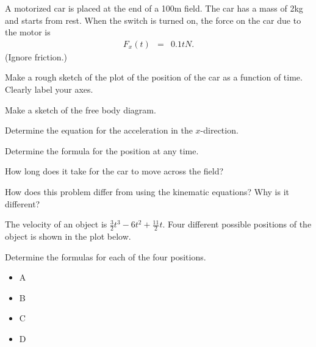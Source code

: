 \begin{problem}

\item A motorized car is placed at the end of a 100m field. The car
  has a mass of 2kg and starts from rest. When the switch is turned
  on, the force on the car due to the motor is
  \begin{eqnarray*}
    F_x(t) & = & 0.1 t N.
  \end{eqnarray*}
  (Ignore friction.)
  \begin{subproblem}
    \item Make a rough sketch of the plot of the position of the car
      as a function of time. Clearly label your axes.
      \vfill
    \item Make a sketch of the free body diagram.
      \vspace{7em}
    \item Determine the equation for the acceleration in the $x$-direction.
      \vspace{5em}
      \clearpage
    \item Determine the formula for the position at any time.
      \vfill
      \vfill
    \item How long does it take for the car to move across the field?
      \vfill

    \item How does this problem differ from using the kinematic
      equations? Why is it different?

      \vfill

  \end{subproblem}

  \clearpage

\item The velocity of an object is
  $\frac{3}{2}t^3-6t^2+\frac{11}{2}t$. Four different possible
  positions of the object is shown in the plot below. \\
  \scalebox{0.6}{}
  \begin{subproblem}
    \item Determine the formulas for each of the four positions.
      \begin{itemize}
      \item A
        \vfill
      \item B
        \vfill
      \item C
        \vfill
      \item D
        \vfill
      \end{itemize}
  \end{subproblem}


\end{problem}
